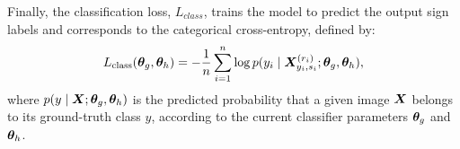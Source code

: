 Finally, the classification loss, $L_{class}$, trains the model to predict the output sign labels and corresponds to the categorical cross-entropy, defined by:
\begin{equation}
    \label{eq:desire_loss_class}
    L_{\text{class}}({\bm{\theta}}_{g},{\bm{\theta}}_{h}) = -\frac{1}{n} \sum_{i=1}^{n}\log p(y_{i} \mid {\bm{X}}^{(r_{i})}_{y_{i}, s_{i}};{\bm{\theta}}_{g},{\bm{\theta}}_{h}),
\end{equation}
where $p(y \mid {\bm{X}}; {\bm{\theta}}_{g},{\bm{\theta}}_{h})$ is the predicted probability that a given image ${\bm{X}}$ belongs to its ground-truth class $y$, according to the current classifier parameters ${\bm{\theta}}_{g}$ and ${\bm{\theta}}_{h}$.